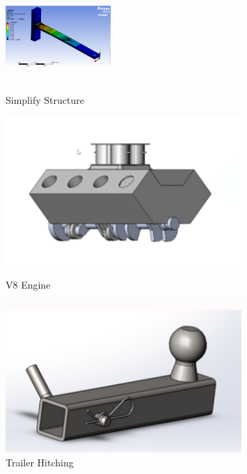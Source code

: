 \documentclass[10pt, letterpaper]{article}
\begin{document}
\begin{figure}[!b]
        \vspace{0.5 cm}

        \begin{minipage}[c]{0.33\linewidth}
            \centering
            \includegraphics[width=4cm]{fig/Mechanical Design/簡化機構分析.png} 
            \caption{\\Simplify Structure}
        \end{minipage}%
        \begin{minipage}[c]{0.33\linewidth}
            \centering
            \includegraphics[width=0.8\textwidth]{fig/Mechanical Design/V8引擎.png}
            \caption{V8 Engine}
        \end{minipage}%
        \begin{minipage}[c]{0.33\linewidth}
            \centering
            \includegraphics[width=0.8\textwidth]{fig/Mechanical Design/拖車栓掛.png}
            \caption{Trailer Hitching}
        \end{minipage}%


\end{figure}
\end{document}
